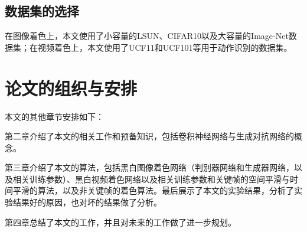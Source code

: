 \subsection{数据集的选择}
\label{sec:1-dataset}

  在图像着色上，本文使用了小容量的LSUN、CIFAR10以及大容量的Image-Net数据集；在视频着色上，本文使用了UCF11和UCF101等用于动作识别的数据集。

\section{论文的组织与安排}
\label{sec:1-org}

  本文的其他章节安排如下：

  第二章介绍了本文的相关工作和预备知识，包括卷积神经网络与生成对抗网络的概念。

  第三章介绍了本文的算法，包括黑白图像着色网络（判别器网络和生成器网络，以及相关训练参数）、黑白视频着色网络以及相关训练参数和关键帧的空间平滑与时间平滑的算法，以及非关键帧的着色算法。最后展示了本文的实验结果，分析了实验结果好的原因，也对坏的结果做了分析。

  第四章总结了本文的工作，并且对未来的工作做了进一步规划。